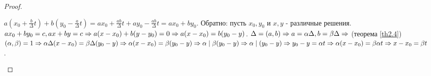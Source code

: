 \documentclass[a4paper, 12pt]{article}
\renewcommand{\div}{\mid}
\theoremstyle{definition}
\begin{document}
\begin{proof}
\begin{itemize}
            $a(x_0+\frac{b}{\Delta}t)+b(y_0-\frac{a}{\Delta}t)=ax_0+\frac{ab}{\Delta}t+ay_0-\frac{ab}{\Delta}t=ax_0+by_0$. Обратно: пусть $x_0,y_0$ и $x,y$ - различные решения. $ax_0+by_0=c, ax+by=c \\ \Rightarrow a(x-x_0)+b(y-y_0)=0\Rightarrow a(x-x_0)=b(y_0-y)$. $\Delta = (a,b) \\ \Rightarrow a=\alpha\Delta, b=\beta\Delta\Rightarrow$ (теорема \ref{th2.4}) $(\alpha,\beta)=1 \\ \Rightarrow \alpha\Delta(x-x_0)=\beta\Delta(y_0-y)\Rightarrow \alpha(x-x_0)=\beta(y_0-y) \\ \Rightarrow \alpha \div \beta(y_0-y)\Rightarrow \alpha \div (y_0-y)\Rightarrow y_0-y=\alpha t\Rightarrow \alpha (x-x_0)=\beta \alpha t\\ \Rightarrow x-x_0=\beta t$.
        \end{itemize}
    \end{proof}
\end{document}
